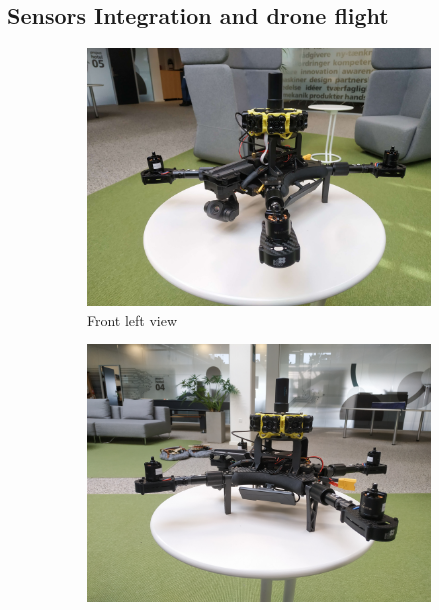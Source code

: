 \subsection{Sensors Integration and drone flight}
\begin{figure}[H]
    \centering
    \begin{subfigure}[b]{0.475\textwidth}
        \centering
        \includegraphics[width=\textwidth]{./projects/logviewer/drone_fl_view.jpg}
        \caption{Front left view}
    \end{subfigure}
    \hfill
    \begin{subfigure}[b]{0.475\textwidth}  
        \centering 
        \includegraphics[width=\textwidth]{./projects/logviewer/drone_l_view.jpg}

\end{subfigure}
\end{figure}
